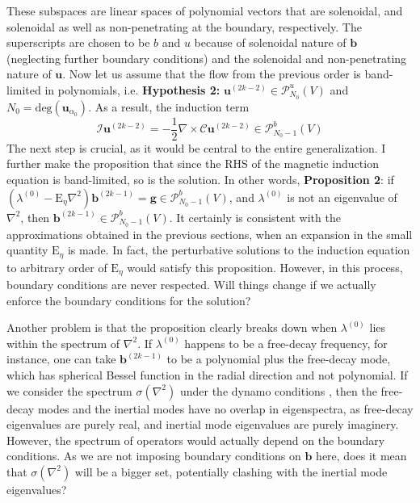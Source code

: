 %
These subspaces are linear spaces of polynomial vectors that are solenoidal, and solenoidal as well as non-penetrating at the boundary, respectively. The superscripts are chosen to be $b$ and $u$ because of solenoidal nature of $\mathbf{b}$ (neglecting further boundary conditions) and the solenoidal and non-penetrating nature of $\mathbf{u}$. Now let us assume that the flow from the previous order is band-limited in polynomials, i.e. {\todoremark \textbf{Hypothesis 2:} $\mathbf{u}^{(2k-2)} \in \boldsymbol{\mathcal{P}}_{N_0}^u(V)$ and $N_0 = \mathrm{deg}(\mathbf{u}_{\alpha_0})$}. As a result, the induction term
%
\begin{equation}
    \mathcal{I} \mathbf{u}^{(2k-2)} = - \frac{1}{2} \nabla\times \mathcal{C} \mathbf{u}^{(2k-2)} \in \boldsymbol{\mathcal{P}}_{N_0 - 1}^b(V)
\end{equation}
%
The next step is crucial, as it would be central to the entire generalization. I further make the proposition that since the RHS of the magnetic induction equation is band-limited, so is the solution. In other words, {\todoremark \textbf{Proposition 2}: if $(\lambda^{(0)} - \mathrm{E}_\eta\nabla^2) \mathbf{b}^{(2k-1)} = \mathbf{g} \in \boldsymbol{\mathcal{P}}_{N_0-1}^b(V)$, and $\lambda^{(0)}$ is not an eigenvalue of $\nabla^2$, then $\mathbf{b}^{(2k-1)} \in \boldsymbol{\mathcal{P}}_{N_0-1}^b(V)$}. 
It certainly is consistent with the approximations obtained in the previous sections, when an expansion in the small quantity $\mathrm{E}_\eta$ is made. In fact, the perturbative solutions to the induction equation to arbitrary order of $\mathrm{E}_\eta$ would satisfy this proposition. 
However, in this process, boundary conditions are never respected. Will things change if we actually enforce the boundary conditions for the solution?

Another problem is that the proposition clearly breaks down when $\lambda^{(0)}$ lies within the spectrum of $\nabla^2$. If $\lambda^{(0)}$ happens to be a free-decay frequency, for instance, one can take $\mathbf{b}^{(2k-1)}$ to be a polynomial plus the free-decay mode, which has spherical Bessel function in the radial direction and not polynomial. 
If we consider the spectrum $\sigma(\nabla^2)$ under the dynamo conditions \citep{roberts_803_2015}, then the free-decay modes and the inertial modes have no overlap in eigenspectra, as free-decay eigenvalues are purely real, and inertial mode eigenvalues are purely imaginery.
However, the spectrum of operators would actually depend on the boundary conditions. As we are not imposing boundary conditions on $\mathbf{b}$ here, does it mean that $\sigma(\nabla^2)$ will be a bigger set, potentially clashing with the inertial mode eigenvalues?

